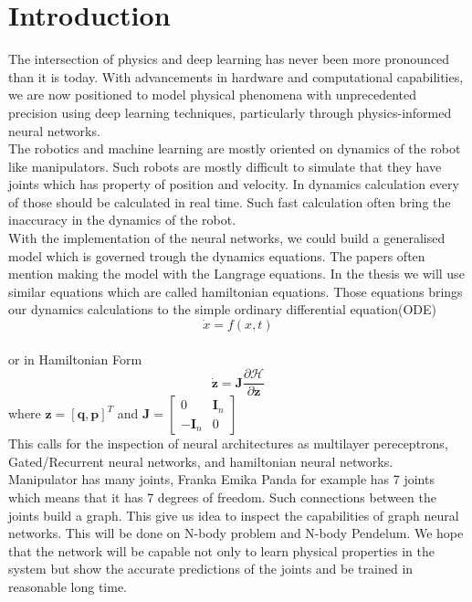 \chapter{Introduction}
The intersection of physics and deep learning has never been more pronounced than it is today. With advancements in hardware and computational capabilities, we are now positioned to model physical phenomena with unprecedented precision using deep learning techniques, particularly through physics-informed neural networks.\\
The robotics and machine learning are mostly oriented on dynamics of the robot like manipulators. Such robots are mostly difficult to simulate that they have joints which has property of position and velocity. In dynamics calculation every of those should be calculated in real time. Such fast calculation often bring the inaccuracy in the dynamics of the robot.\\
With the implementation of the neural networks, we could build a generalised model which is governed trough the dynamics equations. The papers often mention making the model  with the Langrage equations\cite{Delan}. In the thesis we will use similar equations which are called hamiltonian equations. Those equations brings our dynamics calculations to the simple ordinary differential equation(ODE)
\begin{equation}
	\dot{x} = f(x,t)
\end{equation} \\
or in Hamiltonian Form
\begin{equation}
	\dot{\mathbf{z}} = \mathbf{J}\frac{\partial\mathcal{H}}{\partial \mathbf{z}}
\end{equation} where $\mathbf{z}=[\mathbf{q},\mathbf{p}]^T$ and $\mathbf{J} = \begin{bmatrix}
0 & \mathbf{I}_n\\
-\mathbf{I}_n & 0
\end{bmatrix} $\\

This calls for the inspection of neural architectures as multilayer pereceptrons, Gated/Recurrent neural networks, and hamiltonian neural networks.\\ 
Manipulator has many joints, Franka Emika Panda for example has 7 joints which means that it has 7 degrees of freedom. Such connections between the joints build a graph. This give us idea to inspect the capabilities of graph neural networks. This will be done on N-body problem and N-body Pendelum. We hope that the network will be capable not only to learn physical properties in the system but show the accurate predictions of the joints and be trained in reasonable long time.




